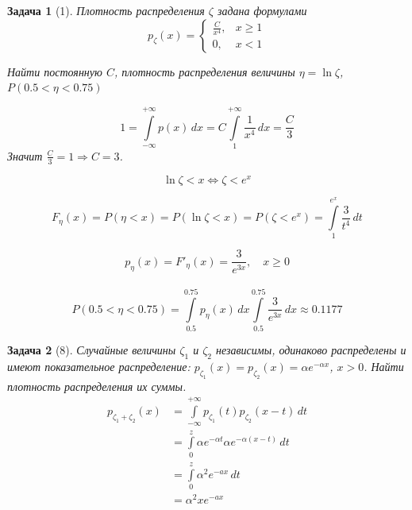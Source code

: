 \documentclass{article}
\theoremstyle{problemstyle}
\newtheorem{problem}{Задача}[section]
\begin{document}
\begin{problem}[1]
    Плотность распределения $\zeta$ задана формулами
    \[
        p_\zeta(x) = \begin{cases}
            \frac{C}{x^4}, & x \geq 1 \\
            0, & x < 1
        \end{cases}
    \]

    Найти постоянную $C$, плотность распределения величины $\eta = \ln \zeta$,
    $P (0.5 < \eta < 0.75)$

    \[
        1 =
        \int\limits_{-\infty}^{+\infty} p(x) \, dx =
        C \int\limits_{1}^{+\infty} \frac{1}{x^4} \, dx =
        \frac{C}{3}
    \]
    Значит $\frac{C}{3} = 1 \Rightarrow C = 3$.

    \[
        \ln \zeta < x \Leftrightarrow \zeta < e^x
    \]

    \[
        F_\eta(x) = P(\eta < x) = P(\ln \zeta < x) = P(\zeta < e^x) =
        \int\limits_{1}^{e^x} \frac{3}{t^4} \, dt
    \]

    \[
        p_\eta(x) = F'_\eta(x) = \frac{3}{e^{3x}}, \quad x \geq 0
    \]
    \
    \[
        P(0.5 < \eta < 0.75) =
        \int\limits_{0.5}^{0.75} p_\eta(x) \, dx
        \int\limits_{0.5}^{0.75} \frac{3}{e^{3x}} \, dx \approx
        0.1177
    \]
\end{problem}

\begin{problem}[8]
    Случайные величины $\zeta_1$ и $\zeta_2$ независимы,
    одинаково распределены и имеют показательное распределение:
    $p_{\zeta_1}(x) = p_{\zeta_2}(x) = \alpha e^{- \alpha x}$, $x > 0$.
    Найти плотность распределения их суммы.
    \begin{align*}    
        p_{\zeta_1 + \zeta_2}(x) &= \int\limits_{-\infty}^{+\infty} p_{\zeta_1}(t) p_{\zeta_2}(x - t) \, dt \\
                                 &= \int\limits_{0}^{z} \alpha e^{- \alpha t} \alpha e^{- \alpha (x-t)} \, dt \\
                                 &= \int\limits_{0}^{z} \alpha^2 e^{-ax} \, dt \\
                                 &= \alpha^2 x e^{-ax}
    \end{align*}
\end{problem}
\end{document}
